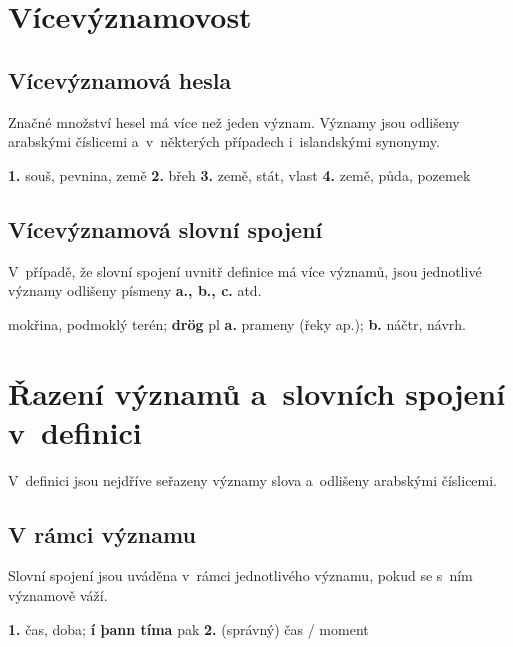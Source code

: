 \section{Vícevýznamovost}

\subsection*{Vícevýznamová hesla}

Značné množství hesel má více než jeden význam. Významy jsou odlišeny arabskými číslicemi a~v~některých případech i~islandskými synonymy.

\blspace
  \dicEntry {}   {\textbf{1.}}  {souš, pevnina, země} {\textbf{2.}}  {břeh} {\textbf{3.}}  {země, stát, vlast} {\textbf{4.}}  {země, půda, pozemek}
\blspace

\subsection*{Vícevýznamová slovní spojení}

V~případě, že slovní spojení uvnitř definice má více významů, jsou jednotlivé významy odlišeny písmeny {\textbf{a., b., c.}} atd.

\blspace
  \dicEntry {} {  {mokřina, podmoklý terén;} \textbf{drög} {\footnotesize{pl}} {\textbf{a.}}  {prameny (řeky ap.);} {\textbf{b.}} {náčtr, návrh.}}
\blspace

\section{Řazení významů a~slovních spojení v~definici}
\longsectionskip

V~definici jsou nejdříve seřazeny významy slova a~odlišeny arabskými číslicemi.

\subsection*{V rámci významu}

Slovní spojení jsou uváděna v~rámci jednotlivého významu, pokud se s~ním významově váží.

\blspace
  \dicEntry {}   {\textbf{1.}}  {čas, doba}; \textbf{í þann tíma}   {pak} {\textbf{2.}}  {(správný) čas / moment}
\blspace

